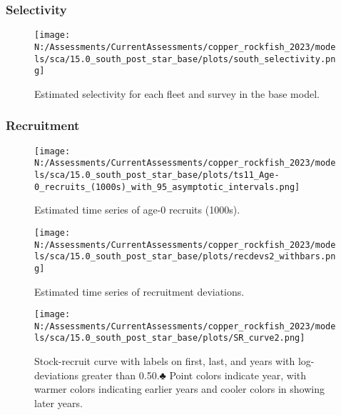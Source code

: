 \documentclass[11pt,
  english,
  letterpaper,
]{article}
\begin{document}
\hypertarget{selectivity}{%
\subsubsection{Selectivity}\label{selectivity}}

\begin{figure}
\centering
\texttt{[image: N:/Assessments/CurrentAssessments/copper\_rockfish\_2023/models/sca/15.0\_south\_post\_star\_base/plots/south\_selectivity.png]}
\caption{Estimated selectivity for each fleet and survey in the base model.\label{fig:est-selex}}
\end{figure}

\newpage

\hypertarget{recruitment-1}{%
\subsubsection{Recruitment}\label{recruitment-1}}

\begin{figure}
\centering
\texttt{[image: N:/Assessments/CurrentAssessments/copper\_rockfish\_2023/models/sca/15.0\_south\_post\_star\_base/plots/ts11\_Age-0\_recruits\_(1000s)\_with\_95\_asymptotic\_intervals.png]}
\caption{Estimated time series of age-0 recruits (1000s).\label{fig:recruits}}
\end{figure}

\pagebreak

\begin{figure}
\centering
\texttt{[image: N:/Assessments/CurrentAssessments/copper\_rockfish\_2023/models/sca/15.0\_south\_post\_star\_base/plots/recdevs2\_withbars.png]}
\caption{Estimated time series of recruitment deviations.\label{fig:rec-devs}}
\end{figure}

\pagebreak

\begin{figure}
\centering
\texttt{[image: N:/Assessments/CurrentAssessments/copper\_rockfish\_2023/models/sca/15.0\_south\_post\_star\_base/plots/SR\_curve2.png]}
\caption{Stock-recruit curve with labels on first, last, and years with log-deviations greater than 0.50.♣ Point colors indicate year, with warmer colors indicating earlier years and cooler colors in showing later years.\label{fig:bh-curve}}
\end{figure}

\pagebreak
\end{document}
